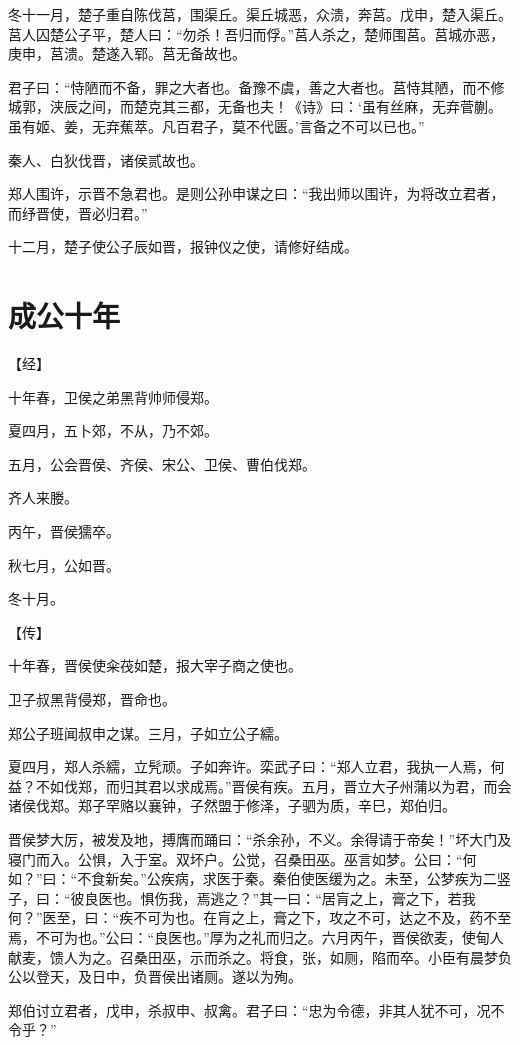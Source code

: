 \documentclass[a4paper,12pt,UTF8,twoside]{ctexbook}
\begin{document}
冬十一月，楚子重自陈伐莒，围渠丘。渠丘城恶，众溃，奔莒。戊申，楚入渠丘。莒人囚楚公子平，楚人曰：“勿杀！吾归而俘。”莒人杀之，楚师围莒。莒城亦恶，庚申，莒溃。楚遂入郓。莒无备故也。

君子曰：“恃陋而不备，罪之大者也。备豫不虞，善之大者也。莒恃其陋，而不修城郭，浃辰之间，而楚克其三都，无备也夫！《诗》曰：‘虽有丝麻，无弃菅蒯。虽有姬、姜，无弃蕉萃。凡百君子，莫不代匮。’言备之不可以已也。”

秦人、白狄伐晋，诸侯贰故也。

郑人围许，示晋不急君也。是则公孙申谋之曰：“我出师以围许，为将改立君者，而纾晋使，晋必归君。”

十二月，楚子使公子辰如晋，报钟仪之使，请修好结成。

\section{成公十年}


【经】

十年春，卫侯之弟黑背帅师侵郑。

夏四月，五卜郊，不从，乃不郊。

五月，公会晋侯、齐侯、宋公、卫侯、曹伯伐郑。

齐人来媵。

丙午，晋侯獳卒。

秋七月，公如晋。

冬十月。

【传】

十年春，晋侯使籴茷如楚，报大宰子商之使也。

卫子叔黑背侵郑，晋命也。

郑公子班闻叔申之谋。三月，子如立公子繻。

夏四月，郑人杀繻，立髠顽。子如奔许。栾武子曰：“郑人立君，我执一人焉，何益？不如伐郑，而归其君以求成焉。”晋侯有疾。五月，晋立大子州蒲以为君，而会诸侯伐郑。郑子罕赂以襄钟，子然盟于修泽，子驷为质，辛巳，郑伯归。

晋侯梦大厉，被发及地，搏膺而踊曰：“杀余孙，不义。余得请于帝矣！”坏大门及寝门而入。公惧，入于室。双坏户。公觉，召桑田巫。巫言如梦。公曰：“何如？”曰：“不食新矣。”公疾病，求医于秦。秦伯使医缓为之。未至，公梦疾为二竖子，曰：“彼良医也。惧伤我，焉逃之？”其一曰：“居肓之上，膏之下，若我何？”医至，曰：“疾不可为也。在肓之上，膏之下，攻之不可，达之不及，药不至焉，不可为也。”公曰：“良医也。”厚为之礼而归之。六月丙午，晋侯欲麦，使甸人献麦，馈人为之。召桑田巫，示而杀之。将食，张，如厕，陷而卒。小臣有晨梦负公以登天，及日中，负晋侯出诸厕。遂以为殉。

郑伯讨立君者，戊申，杀叔申、叔禽。君子曰：“忠为令德，非其人犹不可，况不令乎？”
\end{document}
